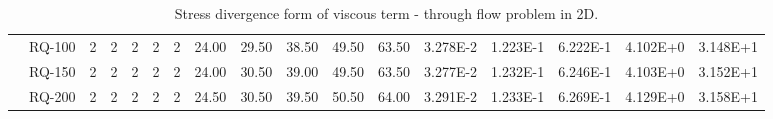\begin{table}[ht]
\begin{center}
{\begin{tabular}{cc|c|c|c|c|c|c|c|c|c|c|c|c|c|c|c|}
\multicolumn{1}{|c|}{}                      & \multicolumn{1}{|c|}{RQ-100} &	2	&	2	&	2	&	2	&	2	&	24.00	&	29.50	&	38.50	&	49.50	&	63.50	&	3.278E-2	&	1.223E-1	&	6.222E-1	&	4.102E+0	&	3.148E+1	\\
\multicolumn{1}{|c|}{}                      & \multicolumn{1}{|c|}{RQ-150} &	2	&	2	&	2	&	2	&	2	&	24.00	&	30.50	&	39.00	&	49.50	&	63.50	&	3.277E-2	&	1.232E-1	&	6.246E-1	&	4.103E+0	&	3.152E+1	\\
\multicolumn{1}{|c|}{}                      & \multicolumn{1}{|c|}{RQ-200} & 	2	&	2	&	2	&	2	&	2	&	24.50	&	30.50	&	39.50	&	50.50	&	64.00	&	3.291E-2	&	1.233E-1	&	6.269E-1	&	4.129E+0	&	3.158E+1	\\
\cline{1-17}
\end{tabular}
}
\end{center}
\caption{Stress divergence form of viscous term - through flow problem in 2D.}
\label{table:stressthroughflow2d}
\end{table}
